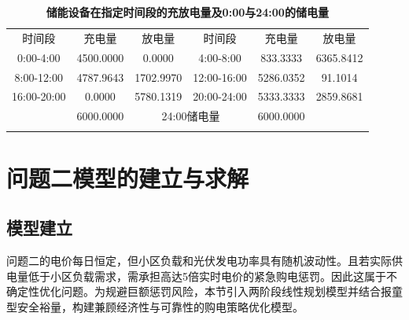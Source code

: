 \documentclass{cumcmthesis}
\begin{document}
    \begin{table}[h]
    \centering
    \caption{\textbf{储能设备在指定时间段的充放电量及0:00与24:00的储电量}}

    \label{tab:storage_energy}
\begin{tabular}{|c|c|c|c|c|c|}
    \noalign{\hrule}
    时间段 & 充电量 & 放电量 & 时间段 & 充电量 & 放电量 \\
    \noalign{\hrule}
    0:00-4:00 & 4500.0000 & 0.0000 & 4:00-8:00 & 833.3333& 6365.8412 \\
    \noalign{\hrule}
    8:00-12:00 & 4787.9643 & 1702.9970 & 12:00-16:00 & 5286.0352 & 91.1014 \\
    \noalign{\hrule}
    16:00-20:00 & 0.0000 & 5780.1319 & 20:00-24:00 & 5333.3333 & 2859.8681 \\
    \noalign{\hrule}
    \multicolumn{2}{|c|}{0:00储电量} & 6000.0000 & \multicolumn{2}{|c|}{24:00储电量} & 6000.0000\\
    \noalign{\hrule}
    \end{tabular}
\end{table}
        \section{问题二模型的建立与求解} 
        \subsection{模型建立}
        问题二的电价每日恒定，但小区负载和光伏发电功率具有随机波动性。且若实际供电量低于小区负载需求，需承担高达5倍实时电价的紧急购电惩罚。因此这属于不确定性优化问题。为规避巨额惩罚风险，本节引入两阶段线性规划模型并结合报童型安全裕量，构建兼顾经济性与可靠性的购电策略优化模型。
\end{document}
